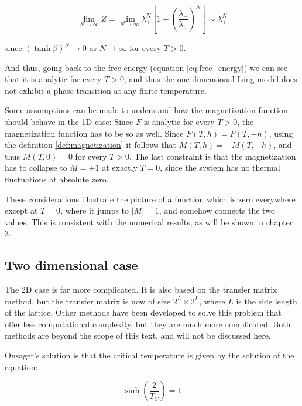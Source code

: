 \begin{equation}
  \lim_{N \rightarrow \infty} Z = \lim_{N \rightarrow \infty} \lambda_{+}^N \left[1 + \left(\frac{\lambda_{-}}{\lambda_{+}}\right)^N\right] \sim \lambda_{+}^N
\end{equation}

since $(\tanh{\beta})^N \rightarrow 0$ as $N \rightarrow \infty$ for every $T > 0$.

And thus, going back to the free energy (equation \ref{eq:free_energy}) we can see that it is analytic for every $T > 0$, and thus the one dimensional Ising model does not exhibit a phase transition at any finite temperature.

\br

Some assumptions can be made to understand how the magnetization function should behave in the 1D case:
Since $F$ is analytic for every $T > 0$, the magnetization function has to be so as well. Since $F(T, h) = F(T, -h)$, using the definition \ref{def:magnetization} it follows that $M(T, h) = - M(T, -h)$, and thus $M(T, 0) = 0$ for every $T > 0$.
The last constraint is that the magnetization has to collapse to $M = \pm 1$ at exactly $T = 0$, since the system has no thermal fluctuations at absolute zero.

These considerations illustrate the picture of a function which is zero everywhere except at $T = 0$, where it jumps to $|M| = 1$, and somehow connects the two values. This is consistent with the numerical results, as will be shown in chapter 3.

\subsection{Two dimensional case}

The 2D case is far more complicated. It is also based on the transfer matrix method, but the transfer matrix is now of size $2^L \times 2^L$, where $L$ is the side length of the lattice. Other methods have been developed to solve this problem that offer less computational complexity, but they are much more complicated. Both methods are beyond the scope of this text, and will not be discussed here.

Onsager's solution is that the critical temperature is given by the solution of the equation:

\begin{equation}
  \label{eq:onsager_condition}
  \sinh \left( \frac{2}{T_C} \right) = 1
\end{equation}

